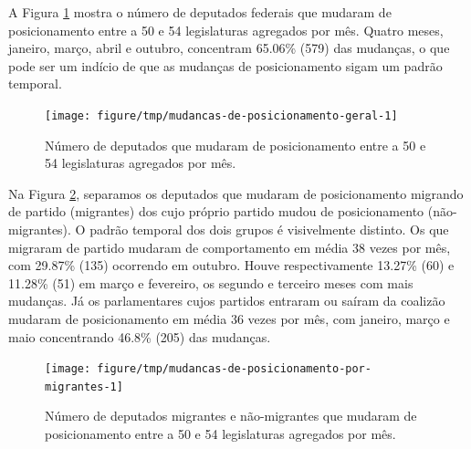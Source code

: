 \documentclass[a4paper,titlepage]{ppgi}\usepackage[]{graphicx}\usepackage[]{color}
\newenvironment{knitrout}{}{} %
\begin{document}
A Figura \ref{fig:mudancas-de-posicionamento-geral} mostra o número de
deputados federais que mudaram de posicionamento entre a 50\textordfeminine{} e
54\textordfeminine{} legislaturas agregados por mês. Quatro meses, janeiro,
março, abril e outubro, concentram
65.06\%
(579) das mudanças, o que pode
ser um indício de que as mudanças de posicionamento sigam um padrão temporal.

\begin{knitrout}
\color{fgcolor}\begin{figure}
\texttt{[image: figure/tmp/mudancas-de-posicionamento-geral-1]} \caption[Número de deputados que mudaram de posicionamento entre a 50\textordfeminine{} e 54\textordfeminine{} legislaturas agregados por mês]{Número de deputados que mudaram de posicionamento entre a 50\textordfeminine{} e 54\textordfeminine{} legislaturas agregados por mês.}\label{fig:mudancas-de-posicionamento-geral}
\end{figure}


\end{knitrout}

Na Figura \ref{fig:mudancas-de-posicionamento-por-migrantes}, separamos os
deputados que mudaram de posicionamento migrando de partido (migrantes) dos
cujo próprio partido mudou de posicionamento (não-migrantes). O padrão temporal
dos dois grupos é visivelmente distinto. Os que migraram de partido mudaram de
comportamento em média 38 vezes por mês, com
29.87\%
(135) ocorrendo em outubro. Houve respectivamente
13.27\%
(60) e
11.28\%
(51) em março e fevereiro, os segundo e terceiro
meses com mais mudanças. Já os parlamentares cujos partidos entraram ou saíram
da coalizão mudaram de posicionamento em média
36 vezes por mês, com janeiro, março e
maio concentrando
46.8\%
(205) das mudanças.

\begin{knitrout}
\color{fgcolor}\begin{figure}
\texttt{[image: figure/tmp/mudancas-de-posicionamento-por-migrantes-1]} \caption[Número de deputados migrantes e não-migrantes que mudaram de posicionamento entre a 50\textordfeminine{} e 54\textordfeminine{} legislaturas agregados por mês]{Número de deputados migrantes e não-migrantes que mudaram de posicionamento entre a 50\textordfeminine{} e 54\textordfeminine{} legislaturas agregados por mês.}\label{fig:mudancas-de-posicionamento-por-migrantes}
\end{figure}


\end{knitrout}
\end{document}
